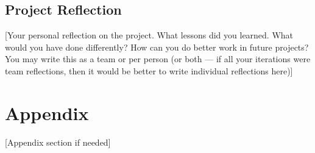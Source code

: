 \documentclass{article}
\begin{document}
\subsection{Project Reflection}
[Your personal reflection on the project. What lessons did you learned. What would you have done differently? How can you do better work in future projects? You may write this as a team or per person (or both --- if all your iterations were team reflections, then it would be better to write individual reflections here)]

\section*{Appendix}
[Appendix section if needed]
\end{document}
